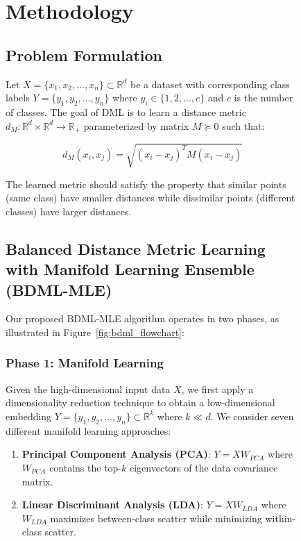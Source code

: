 \documentclass[review]{elsarticle}
\begin{document}
\begin{figure}[htbp]
\section{Methodology}
\label{sec:methodology}

\subsection{Problem Formulation}

Let $X = \{x_1, x_2, \ldots, x_n\} \subset \mathbb{R}^d$ be a dataset with corresponding class labels $Y = \{y_1, y_2, \ldots, y_n\}$ where $y_i \in \{1, 2, \ldots, c\}$ and $c$ is the number of classes. The goal of DML is to learn a distance metric $d_M: \mathbb{R}^d \times \mathbb{R}^d \rightarrow \mathbb{R}_+$ parameterized by matrix $M \succeq 0$ such that:

\begin{equation}
d_M(x_i, x_j) = \sqrt{(x_i - x_j)^T M (x_i - x_j)}
\end{equation}

The learned metric should satisfy the property that similar points (same class) have smaller distances while dissimilar points (different classes) have larger distances.

\subsection{Balanced Distance Metric Learning with Manifold Learning Ensemble (BDML-MLE)}

Our proposed BDML-MLE algorithm operates in two phases, as illustrated in Figure~\ref{fig:bdml_flowchart}:

\subsubsection{Phase 1: Manifold Learning}

Given the high-dimensional input data $X$, we first apply a dimensionality reduction technique to obtain a low-dimensional embedding $Y = \{y_1, y_2, \ldots, y_n\} \subset \mathbb{R}^k$ where $k \ll d$. We consider seven different manifold learning approaches:

\begin{enumerate}
\item \textbf{Principal Component Analysis (PCA)}: $Y = X W_{PCA}$ where $W_{PCA}$ contains the top-$k$ eigenvectors of the data covariance matrix.

\item \textbf{Linear Discriminant Analysis (LDA)}: $Y = X W_{LDA}$ where $W_{LDA}$ maximizes between-class scatter while minimizing within-class scatter.


\end{enumerate}
\end{figure}
\end{document}
